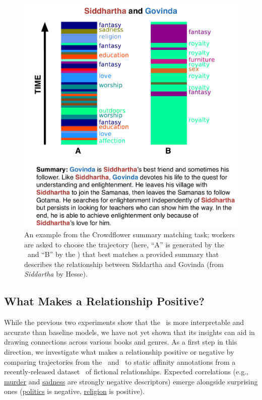 \begin{figure}[t!]
\includegraphics[width=1.0\linewidth]{2016_naacl_relationships/figures/cftask.pdf}
  \caption{An example from the Crowdflower summary matching task;
    workers are asked to choose the trajectory (here, ``A'' is generated by the
    \rmn\ and ``B'' by the \htmm) that best matches a provided summary that
    describes the relationship between Siddartha and Govinda (from
    \textit{Siddartha} by Hesse).}
\label{fig:cftask}
\end{figure}

\subsection{What Makes a Relationship Positive?}

While the previous two experiments show that the \rmn\ is more interpretable and
accurate than baseline models, we have not yet shown that its insights can aid
in drawing connections across various books and genres. As a first step in this
direction, we investigate what makes a relationship positive or negative by
comparing trajectories from the \rmn\ and \htmm\ to static affinity annotations
from a recently-released dataset~\cite{massey2015annotating} of fictional
relationships. Expected correlations (e.g., \underline{murder} and
\underline{sadness} are strongly negative descriptors) emerge alongside
surprising ones (\underline{politics} is negative, \underline{religion} is
positive).

